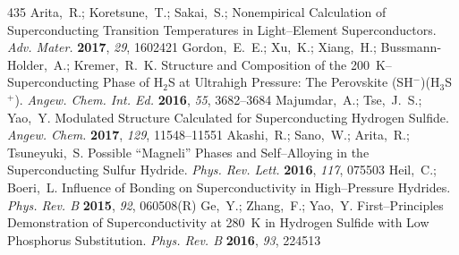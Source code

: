 \documentclass[12pt,letterpaper,oneside]{article}
\begin{document}
\begin{mcitethebibliography}{435}
Arita,~R.; Koretsune,~T.; Sakai,~S.; 
  Nonempirical Calculation of Superconducting Transition Temperatures in
  Light--Element Superconductors. \emph{Adv. Mater.} \textbf{2017}, \emph{29},
  1602421\relax
\mciteBstWouldAddEndPuncttrue
\mciteSetBstMidEndSepPunct{\mcitedefaultmidpunct}
{\mcitedefaultendpunct}{\mcitedefaultseppunct}\relax
\EndOfBibitem
{}
Gordon,~E.~E.; Xu,~K.; Xiang,~H.; Bussmann-Holder,~A.; Kremer,~R.~K.
    Structure and Composition of the 200~K--Superconducting Phase
  of H$_2$S at Ultrahigh Pressure: The Perovskite (SH$^-$)(H$_3$S$^+$).
  \emph{Angew. Chem. Int. Ed.} \textbf{2016}, \emph{55}, 3682--3684\relax
\mciteBstWouldAddEndPuncttrue
\mciteSetBstMidEndSepPunct{\mcitedefaultmidpunct}
{\mcitedefaultendpunct}{\mcitedefaultseppunct}\relax
\EndOfBibitem
{}
Majumdar,~A.; Tse,~J.~S.; Yao,~Y. Modulated Structure Calculated for
  Superconducting Hydrogen Sulfide. \emph{Angew. Chem.} \textbf{2017},
  \emph{129}, 11548--11551\relax
\mciteBstWouldAddEndPuncttrue
\mciteSetBstMidEndSepPunct{\mcitedefaultmidpunct}
{\mcitedefaultendpunct}{\mcitedefaultseppunct}\relax
\EndOfBibitem
{}
Akashi,~R.; Sano,~W.; Arita,~R.; Tsuneyuki,~S. Possible ``Magneli'' Phases and
  Self--Alloying in the Superconducting Sulfur Hydride. \emph{Phys. Rev. Lett.}
  \textbf{2016}, \emph{117}, 075503\relax
\mciteBstWouldAddEndPuncttrue
\mciteSetBstMidEndSepPunct{\mcitedefaultmidpunct}
{\mcitedefaultendpunct}{\mcitedefaultseppunct}\relax
\EndOfBibitem
{}
Heil,~C.; Boeri,~L. Influence of Bonding on Superconductivity in High--Pressure
  Hydrides. \emph{Phys. Rev. B} \textbf{2015}, \emph{92}, 060508(R)\relax
\mciteBstWouldAddEndPuncttrue
\mciteSetBstMidEndSepPunct{\mcitedefaultmidpunct}
{\mcitedefaultendpunct}{\mcitedefaultseppunct}\relax
\EndOfBibitem
{}
Ge,~Y.; Zhang,~F.; Yao,~Y. First--Principles Demonstration of Superconductivity
  at 280~K in Hydrogen Sulfide with Low Phosphorus Substitution. \emph{Phys.
  Rev. B} \textbf{2016}, \emph{93}, 224513\relax
\mciteBstWouldAddEndPuncttrue
\mciteSetBstMidEndSepPunct{\mcitedefaultmidpunct}
{\mcitedefaultendpunct}{\mcitedefaultseppunct}\relax

\end{mcitethebibliography}
\end{document}
